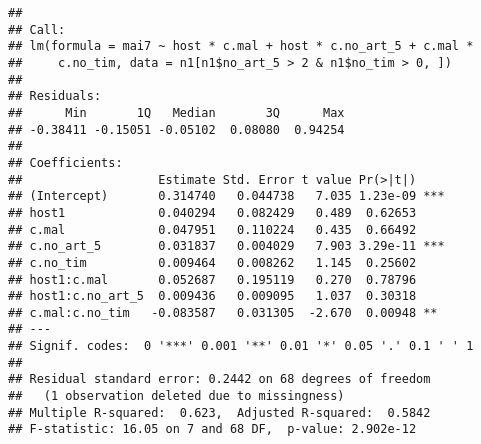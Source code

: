 \documentclass[]{article}
\newenvironment{Shaded}{\begin{snugshade}}{\end{snugshade}}
\newcommand{\KeywordTok}[1]{\textcolor[rgb]{0.13,0.29,0.53}{\textbf{#1}}}
\newcommand{\DataTypeTok}[1]{\textcolor[rgb]{0.13,0.29,0.53}{#1}}
\newcommand{\DecValTok}[1]{\textcolor[rgb]{0.00,0.00,0.81}{#1}}
\newcommand{\StringTok}[1]{\textcolor[rgb]{0.31,0.60,0.02}{#1}}
\newcommand{\OperatorTok}[1]{\textcolor[rgb]{0.81,0.36,0.00}{\textbf{#1}}}
\newcommand{\NormalTok}[1]{#1}
\begin{document}
\begin{verbatim}
## 
## Call:
## lm(formula = mai7 ~ host * c.mal + host * c.no_art_5 + c.mal * 
##     c.no_tim, data = n1[n1$no_art_5 > 2 & n1$no_tim > 0, ])
## 
## Residuals:
##      Min       1Q   Median       3Q      Max 
## -0.38411 -0.15051 -0.05102  0.08080  0.94254 
## 
## Coefficients:
##                   Estimate Std. Error t value Pr(>|t|)    
## (Intercept)       0.314740   0.044738   7.035 1.23e-09 ***
## host1             0.040294   0.082429   0.489  0.62653    
## c.mal             0.047951   0.110224   0.435  0.66492    
## c.no_art_5        0.031837   0.004029   7.903 3.29e-11 ***
## c.no_tim          0.009464   0.008262   1.145  0.25602    
## host1:c.mal       0.052687   0.195119   0.270  0.78796    
## host1:c.no_art_5  0.009436   0.009095   1.037  0.30318    
## c.mal:c.no_tim   -0.083587   0.031305  -2.670  0.00948 ** 
## ---
## Signif. codes:  0 '***' 0.001 '**' 0.01 '*' 0.05 '.' 0.1 ' ' 1
## 
## Residual standard error: 0.2442 on 68 degrees of freedom
##   (1 observation deleted due to missingness)
## Multiple R-squared:  0.623,  Adjusted R-squared:  0.5842 
## F-statistic: 16.05 on 7 and 68 DF,  p-value: 2.902e-12
\end{verbatim}

\begin{Shaded}
\end{Shaded}
\end{document}

